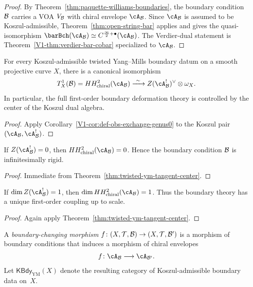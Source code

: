 \begin{proof}
By Theorem~\ref{thm:paquette-williams-boundaries}, the boundary condition $\mathcal{B}$ carries a
VOA $V_{\mathcal{B}}$ with chiral envelope $\cA_{\cB}$. Since $\cA_{\cB}$ is assumed to be
Koszul-admissible, Theorem~\ref{thm:open-string-bar} applies and gives the quasi-isomorphism
$\barBch(\cA_{\cB}) \simeq C^{\frac{\infty}{2}+\bullet}(\cA_{\cB})$. The Verdier-dual statement is
Theorem~\ref*{V1-thm:verdier-bar-cobar} specialized to $\cA_{\cB}$.
\end{proof}

\begin{theorem}
For every Koszul-admissible twisted Yang--Mills boundary datum on a smooth projective
curve $X$, there is a canonical isomorphism
\[
T^1_X(\cB)
= HH^2_{\mathrm{chiral}}(\cA_{\cB})
\xrightarrow{\ \sim\ }
Z(\cA_{\cB}^!)^{\vee} \otimes \omega_X.
\]
In particular, the full first-order boundary deformation theory is controlled by the center
of the Koszul dual algebra.
\end{theorem}

\begin{proof}
Apply Corollary~\ref*{V1-cor:def-obs-exchange-genus0} to the Koszul pair
$(\cA_{\cB}, \cA_{\cB}^!)$.
\end{proof}

\begin{corollary}
If $Z(\cA_{\cB}^!) = 0$, then $HH^2_{\mathrm{chiral}}(\cA_{\cB}) = 0$.
Hence the boundary condition $\mathcal{B}$ is infinitesimally rigid.
\end{corollary}

\begin{proof}
Immediate from Theorem~\ref{thm:twisted-ym-tangent-center}.
\end{proof}

\begin{corollary}
If $\dim Z(\cA_{\cB}^!) = 1$, then $\dim HH^2_{\mathrm{chiral}}(\cA_{\cB}) = 1$.
Thus the boundary theory has a unique first-order coupling up to scale.
\end{corollary}

\begin{proof}
Again apply Theorem~\ref{thm:twisted-ym-tangent-center}.
\end{proof}

\begin{definition}
A \emph{boundary-changing morphism}
$f \colon (X,\mathcal{T},\mathcal{B}) \to (X,\mathcal{T},\mathcal{B}')$
is a morphism of boundary conditions that induces a morphism of chiral envelopes
\[
f \colon \cA_{\cB} \longrightarrow \cA_{\cB'}.
\]
Let $\mathsf{KBdy}_{\mathrm{YM}}(X)$ denote the resulting category of Koszul-admissible
boundary data on~$X$.
\end{definition}

